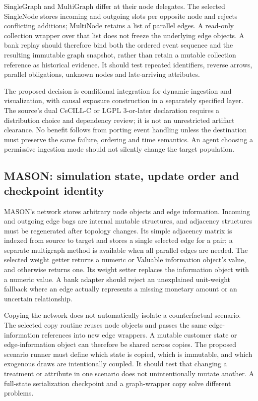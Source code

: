 SingleGraph and MultiGraph differ at their node delegates. The selected SingleNode stores incoming and outgoing slots per opposite node and rejects conflicting additions; MultiNode retains a list of parallel edges. A read-only collection wrapper over that list does not freeze the underlying edge objects. A bank replay should therefore bind both the ordered event sequence and the resulting immutable graph snapshot, rather than retain a mutable collection reference as historical evidence. It should test repeated identifiers, reverse arrows, parallel obligations, unknown nodes and late-arriving attributes.\citep{exec25_jnet_graphstream}

The proposed decision is conditional integration for dynamic ingestion and visualization, with causal exposure construction in a separately specified layer. The source's dual CeCILL-C or LGPL 3-or-later declaration requires a distribution choice and dependency review; it is not an unrestricted artifact clearance. No benefit follows from porting event handling unless the destination must preserve the same failure, ordering and time semantics. An agent choosing a permissive ingestion mode should not silently change the target population.\citep{exec25_jnet_graphstream,exec25_jnet_choice}

\subsection{MASON: simulation state, update order and checkpoint identity}

MASON's network stores arbitrary node objects and edge information. Incoming and outgoing edge bags are internal mutable structures, and adjacency structures must be regenerated after topology changes. Its simple adjacency matrix is indexed from source to target and stores a single selected edge for a pair; a separate multigraph method is available when all parallel edges are needed. The selected weight getter returns a numeric or Valuable information object's value, and otherwise returns one. Its weight setter replaces the information object with a numeric value. A bank adapter should reject an unexplained unit-weight fallback where an edge actually represents a missing monetary amount or an uncertain relationship.\citep{exec25_jnet_mason}

Copying the network does not automatically isolate a counterfactual scenario. The selected copy routine reuses node objects and passes the same edge-information references into new edge wrappers. A mutable customer state or edge-information object can therefore be shared across copies. The proposed scenario runner must define which state is copied, which is immutable, and which exogenous draws are intentionally coupled. It should test that changing a treatment or attribute in one scenario does not unintentionally mutate another. A full-state serialization checkpoint and a graph-wrapper copy solve different problems.\citep{exec25_jnet_mason}

